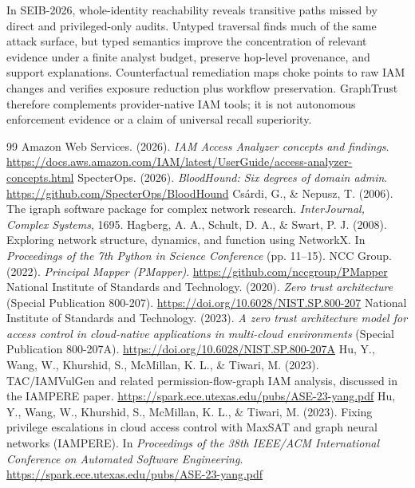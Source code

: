 \documentclass[10pt]{article}
\begin{document}
In SEIB-2026, whole-identity reachability reveals transitive paths missed by direct and privileged-only audits. Untyped traversal finds much of the same attack surface, but typed semantics improve the concentration of relevant evidence under a finite analyst budget, preserve hop-level provenance, and support explanations. Counterfactual remediation maps choke points to raw IAM changes and verifies exposure reduction plus workflow preservation. GraphTrust therefore complements provider-native IAM tools; it is not autonomous enforcement evidence or a claim of universal recall superiority.

\clearpage
\begin{thebibliography}{99}
 Amazon Web Services. (2026). \textit{IAM Access Analyzer concepts and findings}. \url{https://docs.aws.amazon.com/IAM/latest/UserGuide/access-analyzer-concepts.html}
 SpecterOps. (2026). \textit{BloodHound: Six degrees of domain admin}. \url{https://github.com/SpecterOps/BloodHound}
 Csárdi, G., \& Nepusz, T. (2006). The igraph software package for complex network research. \textit{InterJournal, Complex Systems}, 1695.
 Hagberg, A. A., Schult, D. A., \& Swart, P. J. (2008). Exploring network structure, dynamics, and function using NetworkX. In \textit{Proceedings of the 7th Python in Science Conference} (pp. 11--15).
 NCC Group. (2022). \textit{Principal Mapper (PMapper)}. \url{https://github.com/nccgroup/PMapper}
 National Institute of Standards and Technology. (2020). \textit{Zero trust architecture} (Special Publication 800-207). \url{https://doi.org/10.6028/NIST.SP.800-207}
 National Institute of Standards and Technology. (2023). \textit{A zero trust architecture model for access control in cloud-native applications in multi-cloud environments} (Special Publication 800-207A). \url{https://doi.org/10.6028/NIST.SP.800-207A}
 Hu, Y., Wang, W., Khurshid, S., McMillan, K. L., \& Tiwari, M. (2023). TAC/IAMVulGen and related permission-flow-graph IAM analysis, discussed in the IAMPERE paper. \url{https://spark.ece.utexas.edu/pubs/ASE-23-yang.pdf}
 Hu, Y., Wang, W., Khurshid, S., McMillan, K. L., \& Tiwari, M. (2023). Fixing privilege escalations in cloud access control with MaxSAT and graph neural networks (IAMPERE). In \textit{Proceedings of the 38th IEEE/ACM International Conference on Automated Software Engineering}. \url{https://spark.ece.utexas.edu/pubs/ASE-23-yang.pdf}

\end{thebibliography}
\end{document}
